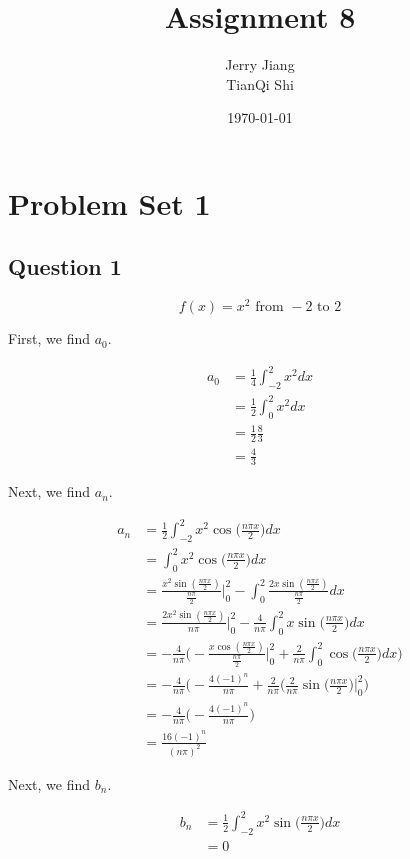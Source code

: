 \documentclass[titlepage]{article}
\title{Assignment 8}
\date{\today}
\author{Jerry Jiang\\ TianQi Shi}
\begin{document}
\maketitle

\noindent
\section*{Problem Set 1}
\subsection*{Question 1}
$$f(x) = x^2 \text{ from } -2 \text{ to } 2$$

First, we find $a_0$.

\begin{align*}
    a_0 &= \frac{1}{4}\int_{-2}^{2} x^2 dx
    \\ &= \frac{1}{2}\int_{0}^{2} x^2 dx
    \\ &= \frac{1}{2} \frac{8}{3}
    \\ &= \frac{4}{3}
\end{align*}

Next, we find $a_n$.

\begin{align*}
    a_n &= \frac{1}{2} \int_{-2}^{2} x^2 \cos\bigg(\frac{n\pi x}{2}\bigg) dx
    \\ &= \int_{0}^{2} x^2 \cos\bigg(\frac{n\pi x}{2}\bigg) dx
    \\ &= \frac{x^2 \sin(\frac{n\pi x}{2})}{\frac{n\pi}{2}} \bigg|_0^2 - \int_{0}^{2}  \frac{2x \sin(\frac{n\pi x}{2})}{\frac{n\pi}{2}} dx
    \\ &= \frac{2x^2 \sin(\frac{n\pi x}{2})}{n\pi} \bigg|_0^2 - \frac{4}{n\pi} \int_{0}^{2} x \sin\bigg(\frac{n\pi x}{2}\bigg) dx
    \\ &= - \frac{4}{n\pi} \bigg( -\frac{x \cos(\frac{n\pi x}{2})}{\frac{n\pi}{2}} \bigg|_0^2 + \frac{2}{n\pi} \int_{0}^{2} \cos\bigg(\frac{n\pi x}{2}\bigg) dx \bigg)
    \\ &= - \frac{4}{n\pi} \bigg( -\frac{4 (-1)^n}{n\pi} + \frac{2}{n\pi} \bigg( \frac{2}{n\pi} \sin\bigg(\frac{n\pi x}{2}\bigg) \bigg|_0^2 \bigg)
    \\ &= - \frac{4}{n\pi} \bigg( -\frac{4 (-1)^n}{n\pi} \bigg)
    \\ &= \frac{16 (-1)^n}{(n\pi)^2}
\end{align*}

Next, we find $b_n$.

\begin{align*}
    b_n &= \frac{1}{2} \int_{-2}^{2} x^2 \sin\bigg(\frac{n\pi x}{2}\bigg) dx
    \\ &= 0
\end{align*}
\end{document}
